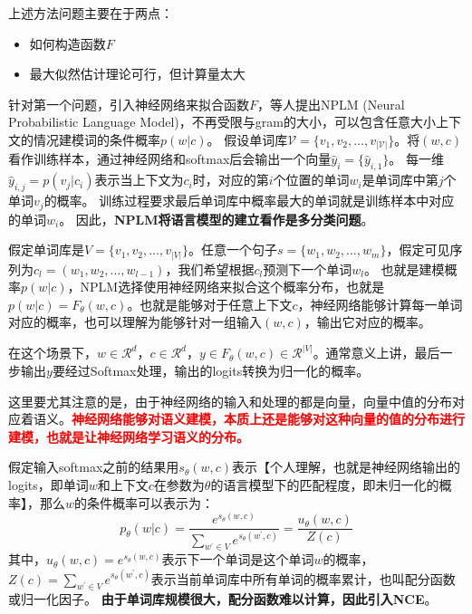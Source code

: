 \documentclass{article}
\begin{document}
上述方法问题主要在于两点：
\begin{itemize}
    \item 如何构造函数$F$
    \item 最大似然估计理论可行，但计算量太大
\end{itemize}

针对第一个问题，引入神经网络来拟合函数$F$，\cite{DBLP:journals/jmlr/BengioDVJ03}等人提出NPLM (Neural Probabilistic Language Model)，不再受限与gram的大小，可以包含任意大小上下文的情况建模词的条件概率$p(w|c)$。
假设单词库$\mathcal{V} = \{v_1, v_2, \ldots, v_{|\mathcal{V}|}\}$。将$(w,c)$看作训练样本，通过神经网络和softmax后会输出一个向量$\hat{y}_i=\{\hat{y}_{i,1}\}$。
每一维$\hat{y}_{i,j}=p(v_j|c_i)$表示当上下文为$c_i$时，对应的第$i$个位置的单词$w_i$是单词库中第$j$个单词$v_j$的概率。
训练过程要求最后单词库中概率最大的单词就是训练样本中对应的单词$w_i$。
因此，\textbf{NPLM将语言模型的建立看作是多分类问题}。

\begin{tcolorbox}[title = NPLM解释]
假定单词库是$V = \{v_1, v_2, \ldots, v_{|V|}\}$。任意一个句子$s = \{w_1, w_2, \ldots, w_m\}$，假定可见序列为$c_l = (w_1, w_2,\ldots, w_{l-1})$，我们希望根据$c_l$预测下一个单词$w_l$。
也就是建模概率$p(w|c)$，NPLM选择使用神经网络来拟合这个概率分布，也就是$p(w|c)=F_{\theta}(w,c)$。也就是能够对于任意上下文$c$，神经网络能够计算每一单词对应的概率，也可以理解为能够针对一组输入$(w,c)$，输出它对应的概率。

在这个场景下，$w \in \mathcal{R}^d$，$c \in \mathcal{R}^d$，$y\in F_\theta(w,c) \in \mathcal{R}^{|V|}$。通常意义上讲，最后一步输出$y$要经过Softmax处理，输出的logits转换为归一化的概率。

这里要尤其注意的是，由于神经网络的输入和处理的都是向量，向量中值的分布对应着语义。\textbf{\textcolor{red}{神经网络能够对语义建模，本质上还是能够对这种向量的值的分布进行建模，也就是让神经网络学习语义的分布。}}

\end{tcolorbox}

假定输入softmax之前的结果用$s_\theta(w,c)$表示【个人理解，也就是神经网络输出的logits，即单词$w$和上下文$c$在参数为$\theta$的语言模型下的匹配程度，即未归一化的概率】，那么$w$的条件概率可以表示为：
\begin{equation}
    p_\theta(w|c)=\frac{e^{s_\theta(w,c)}}{\sum_{w^{'}\in V}e^{s_\theta(w^{'},c)}} = \frac{u_\theta(w,c)}{Z(c)}
    \label{EQ:NPLM_SOFTMAX}
\end{equation}
其中，$u_\theta(w,c)=e^{s_\theta(w,c)}$表示下一个单词是这个单词$w$的概率，$Z(c)=\sum_{w^{'}\in V}e^{s_\theta(w^{'},c)}$表示当前单词库中所有单词的概率累计，也叫配分函数或归一化因子。
\textbf{由于单词库规模很大，配分函数难以计算，因此引入NCE}。
\end{document}
